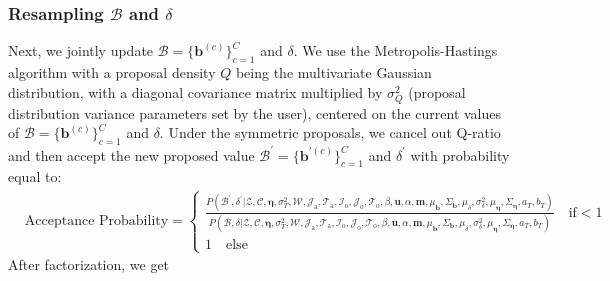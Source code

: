    \subsubsection{Resampling $\mathcal{B}$ and $\delta$}  \label{subsec: Resampling B}
   Next, we jointly update $\mathcal{B}=\{\boldsymbol{b}^{(c)}\}_{c=1}^C$ and $\delta$. We use the Metropolis-Hastings algorithm with a proposal density $Q$ being the multivariate Gaussian distribution, with a diagonal covariance matrix multiplied by $\sigma^2_Q$ (proposal distribution variance parameters set by the user), centered on the current values of $\mathcal{B}=\{\boldsymbol{b}^{(c)}\}_{c=1}^C$ and $\delta$. Under the symmetric proposals, we cancel out Q-ratio and then accept the new proposed value $\mathcal{B}^\prime=\{\boldsymbol{b}^{\prime(c)}\}_{c=1}^C$ and $\delta^\prime$ with probability equal to:
   \begin{equation}
   \begin{split}
   & \mbox{Acceptance Probability}=
   \begin{cases}  \frac{P(\mathcal{B}^\prime, \delta^\prime|\mathcal{Z},   \mathcal{C}, \boldsymbol{\eta}, \sigma_T^2, \mathcal{W},  \mathcal{J}_{\mbox{a}}, \mathcal{T}_{\mbox{a}},\mathcal{I}_{\mbox{o}}, \mathcal{J}_{\mbox{o}}, \mathcal{T}_{\mbox{o}}, \beta, \boldsymbol{u}, \alpha, \boldsymbol{m},\mu_{\boldsymbol{b}}, \Sigma_{\boldsymbol{b}}, \mu_\delta, \sigma^2_\delta, \mu_{\boldsymbol{\eta}}, \Sigma_{\boldsymbol{\eta}}, a_T, b_T)}{P(\mathcal{B}, \delta|\mathcal{Z},   \mathcal{C}, \boldsymbol{\eta}, \sigma_T^2,\mathcal{W}, \mathcal{J}_{\mbox{a}}, \mathcal{T}_{\mbox{a}},\mathcal{I}_{\mbox{o}}, \mathcal{J}_{\mbox{o}}, \mathcal{T}_{\mbox{o}}, \beta, \boldsymbol{u}, \alpha, \boldsymbol{m}, \mu_{\boldsymbol{b}}, \Sigma_{\boldsymbol{b}}, \mu_\delta, \sigma^2_\delta, \mu_{\boldsymbol{\eta}}, \Sigma_{\boldsymbol{\eta}}, a_T, b_T)}\quad\text{if}  <1\\
   1 \quad \text{else}
   \end{cases}
   \end{split}
   \end{equation}
   After factorization, we get
